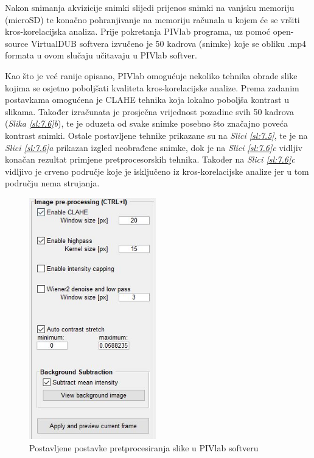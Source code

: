 \par
Nakon snimanja akvizicije snimki slijedi prijenos snimki na vanjsku memoriju (microSD) te konačno pohranjivanje na memoriju računala u kojem će se vršiti kros-korelacijska analiza. Prije pokretanja PIVlab programa, uz pomoć open-source VirtualDUB softvera \cite{virtualdub} izvučeno je 50 kadrova (snimke) koje se obliku .mp4 formata u ovom slučaju učitavaju u PIVlab softver.
\begin{description}[style=unboxed,leftmargin=0cm]
	\item[Pretprocesiranje snimki] Kao što je već ranije opisano, PIVlab omogućuje nekoliko tehnika obrade slike kojima se osjetno poboljšati kvaliteta kros-korelacijske analize. Prema zadanim postavkama omogućena je CLAHE tehnika koja lokalno poboljša kontrast u slikama. Također izračunata je prosječna vrijednost pozadine svih 50 kadrova (\textit{Slika \ref{sl:7.6}b}), te je oduzeta od svake snimke posebno što značajno poveća kontrast snimki. Ostale postavljene tehnike prikazane su na \textit{Slici \ref{sl:7.5}}, te je na \textit{Slici \ref{sl:7.6}a} prikazan izgled neobrađene snimke, dok je na \textit{Slici \ref{sl:7.6}c} vidljiv konačan rezultat primjene pretprocesorskih tehnika. Također na \textit{Slici \ref{sl:7.6}c} vidljivo je crveno područje koje je isključeno iz kros-korelacijske analize jer u tom području nema strujanja.
	 \begin{figure}[h]  
		\centering
		\includegraphics[width=5.5cm]{./7_LowCostPIV/slika7_5.jpg} 
		\caption{Postavljene postavke pretprocesiranja slike u PIVlab softveru}

\end{figure}
\end{description}
